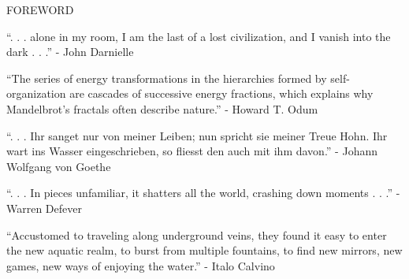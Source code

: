 \documentclass[11pt]{article}
\begin{document}
\begingroup
\begin{center}
\huge FOREWORD
\end{center}
\endgroup

\vspace*{2\baselineskip}

\begingroup
\begin{center}
``. . . alone in my room, I am the last of a lost civilization, and I vanish into the dark . . .''
\rightskip\leftskip
\phantom{text} \hfill - John Darnielle
\end{center}
\endgroup

\vspace*{4\baselineskip}

\begingroup
\begin{center}
``The series of energy transformations in the hierarchies formed by self-organization are cascades of successive energy fractions, which explains why Mandelbrot's fractals often describe nature.''
\rightskip\leftskip
\phantom{text} \hfill - Howard T. Odum
\end{center}
\endgroup

\vspace*{4\baselineskip}

\begingroup
\begin{center}
``. . . Ihr sanget nur von meiner Leiben; nun spricht sie meiner Treue Hohn. Ihr wart ins Wasser eingeschrieben, so fliesst den auch mit ihm davon.''
\rightskip\leftskip
\phantom{text} \hfill - Johann Wolfgang von Goethe
\end{center}
\endgroup

\vspace*{4\baselineskip}

\begingroup
\begin{center}
``. . . In pieces unfamiliar, it shatters all the world, crashing down moments . . .''
\rightskip\leftskip
\phantom{text} \hfill - Warren Defever
\end{center}
\endgroup

\vspace*{4\baselineskip}

\begingroup
\begin{center}
``Accustomed to traveling along underground veins, they found it easy to enter the new aquatic realm, to burst from multiple fountains, to find new mirrors, new games, new ways of enjoying the water.''
\rightskip\leftskip
\phantom{text} \hfill - Italo Calvino
\end{center}
\endgroup
\end{document}
